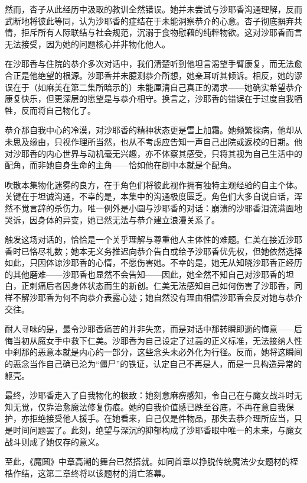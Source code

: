 然而，杏子从此经历中汲取的教训全然错误。她并未尝试与沙耶香沟通理解，反而武断地将彼此等同，认为沙耶香的症结在于未能洞察恭介的心意。杏子彻底摒弃共情，拒斥所有人际联结与社会规范，沉溺于食物慰藉的纯粹物欲。这对沙耶香而言无法接受，因为她的问题核心并非物化他人。

在沙耶香与住院的恭介多次对话中，我们清楚听到他坦言渴望手臂康复，而无法愈合正是他绝望的根源。沙耶香并未臆测恭介所想，她亲耳听其倾诉。相反，她的谬误在于（如麻美在第二集所暗示的）未能厘清自己真正的渴求——她确实希望恭介康复快乐，但更深层的愿望是与恭介相守。换言之，沙耶香的错误在于过度自我牺牲，反而将自己物化了。

恭介那自我中心的冷漠，对沙耶香的精神状态更是雪上加霜。她频繁探病，他却从未思及缘由，只视作理所当然，也从不考虑应告知一声自己出院或返校的日期。他对沙耶香的内心世界与动机毫无兴趣，亦不体察其感受，只将其视为自己生活中的配角，而非她自身生命的主角——恰如他在剧中本就是个配角。

吹散本集物化迷雾的良方，在于角色们将彼此视作拥有独特主观经验的自主个体。关键在于坦诚沟通，不幸的是，本集中的沟通极度匮乏。角色们大多自说自话，浑然不觉言辞的杀伤力。唯一例外是小圆与沙耶香的对话：崩溃的沙耶香泪流满面地哭诉，因身体的异变，她已然无法与恭介建立浪漫关系了。

触发这场对话的，恰恰是一个关乎理解与尊重他人主体性的难题。仁美在接近沙耶香时已恪尽礼数；她本无义务推迟向恭介告白或给予沙耶香优先权，但她依然选择如此，只因体谅沙耶香的心情，不愿伤害她。不幸的是，她无从知晓沙耶香正经历的其他磨难——沙耶香也显然不会告知——因此，她全然不知自己对沙耶香的坦白，正刺痛后者因身体状态而生的新创。仁美无法感知自己如何伤害了沙耶香，同样不解沙耶香为何不向恭介表露心迹；她自然没有理由相信沙耶香会反对她与恭介交往。

耐人寻味的是，最令沙耶香痛苦的并非失恋，而是对话中那转瞬即逝的悔意——后悔当初从魔女手中救下仁美。沙耶香为自己设定了过高的正义标准，无法接纳人性中刹那的恶意本就是内心的一部分，这些念头未必外化为行径。反而，她将这瞬间的恶念当作自己确已沦为“僵尸”的铁证，认定自己不再是人，而是一具构造异常的躯壳。

最终，沙耶香走入了自我物化的极致：她刻意麻痹感知，令自己在与魔女战斗时无知无觉，仅靠治愈魔法修复伤痕。她的自我价值感已跌至谷底，不再在意自我保护，亦拒绝接受他人援手。在她看来，自己仅是件物品，那失去恭介理所应当，只是时间问题罢了。此刻，绝望与深沉的抑郁构成了沙耶香眼中唯一的未来，与魔女战斗则成了她仅存的意义。

至此，《魔圆》中章高潮的舞台已然搭就。如同首章以挣脱传统魔法少女题材的桎梏作结，这第二章终将以该题材的消亡落幕。
